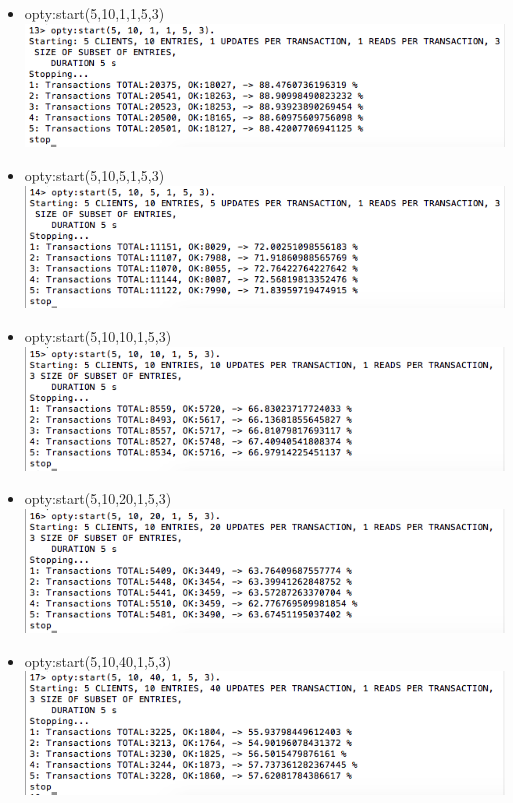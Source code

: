 \documentclass[a4paper, 11pt]{article}
\begin{document}
\begin{itemize}
\item opty:start(5,10,1,1,5,3)\\
\includegraphics[scale=0.5]{images/exp-iii-1.png} \\
\item opty:start(5,10,5,1,5,3)\\
\includegraphics[scale=0.5]{images/exp-iii-2.png} \\
\newpage
\item opty:start(5,10,10,1,5,3)\\
\includegraphics[scale=0.5]{images/exp-iii-3.png} \\
\item opty:start(5,10,20,1,5,3)\\
\includegraphics[scale=0.5]{images/exp-iii-4.png} \\
\item opty:start(5,10,40,1,5,3)\\
\includegraphics[scale=0.5]{images/exp-iii-5.png} \\

\end{itemize}
\end{document}
